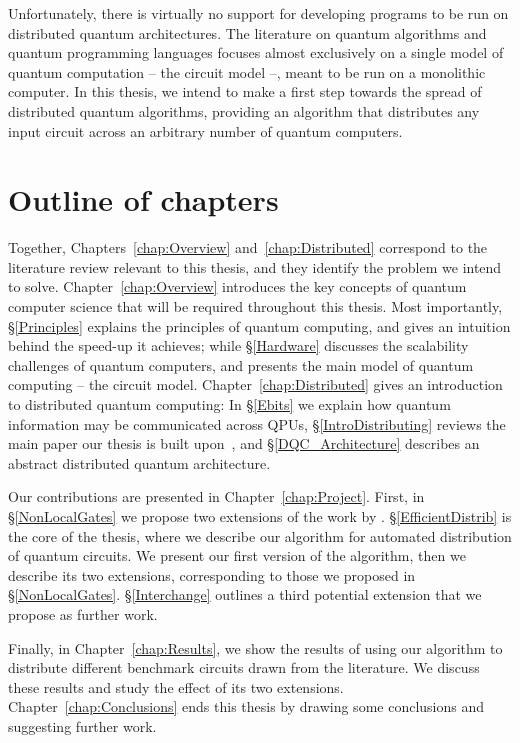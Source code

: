 Unfortunately, there is virtually no support for developing programs to be run on distributed quantum architectures. The literature on quantum algorithms and quantum programming languages focuses almost exclusively on a single model of quantum computation -- the circuit model --, meant to be run on a monolithic computer. In this thesis, we intend to make a first step towards the spread of distributed quantum algorithms, providing an algorithm that distributes any input circuit across an arbitrary number of quantum computers.

\section{Outline of chapters}

Together, Chapters~\ref{chap:Overview} and~\ref{chap:Distributed} correspond to the literature review relevant to this thesis, and they identify the problem we intend to solve. Chapter~\ref{chap:Overview} introduces the key concepts of quantum computer science that will be required throughout this thesis. Most importantly, \S\ref{Principles} explains the principles of quantum computing, and gives an intuition behind the speed-up it achieves; while \S\ref{Hardware} discusses the scalability challenges of quantum computers, and presents the main model of quantum computing -- the circuit model. Chapter~\ref{chap:Distributed} gives an introduction to distributed quantum computing: In \S\ref{Ebits} we explain how quantum information may be communicated across QPUs, \S\ref{IntroDistributing} reviews the main paper our thesis is built upon~\citep{NonLocalCNOT}, and \S\ref{DQC_Architecture} describes an abstract distributed quantum architecture.

Our contributions are presented in Chapter~\ref{chap:Project}. First, in \S\ref{NonLocalGates} we propose two extensions of the work by \citet{NonLocalCNOT}. \S\ref{EfficientDistrib} is the core of the thesis, where we describe our algorithm for automated distribution of quantum circuits. We present our first version of the algorithm, then we describe its two extensions, corresponding to those we proposed in \S\ref{NonLocalGates}. \S\ref{Interchange} outlines a third potential extension that we propose as further work.

Finally, in Chapter~\ref{chap:Results}, we show the results of using our algorithm to distribute different benchmark circuits drawn from the literature. We discuss these results and study the effect of its two extensions. Chapter~\ref{chap:Conclusions} ends this thesis by drawing some conclusions and suggesting further work.